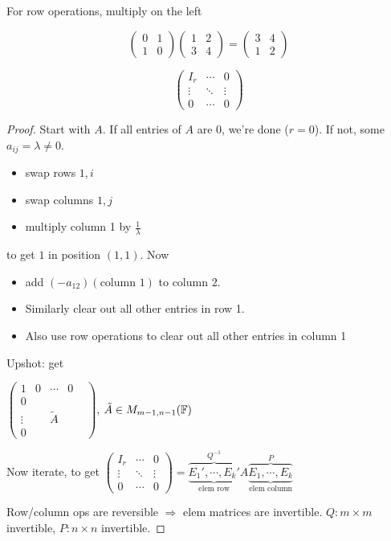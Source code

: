 \documentclass[a4paper]{article}
\begin{document}
For row operations, multiply on the left

\begin{ex}
\[ \begin{pmatrix}
0 & 1 \\
1 & 0
\end{pmatrix} \begin{pmatrix}
1 & 2\\
3 & 4
\end{pmatrix} = \begin{pmatrix}
3 & 4\\
1 & 2
\end{pmatrix} \]	
\end{ex}

 
\[ \begin{pmatrix}
I_{r} & \cdots & 0 \\
\vdots & \ddots & \vdots \\
0 & \cdots & 0  \end{pmatrix} \]

\begin{proof}
	Start with $ A $. If all entries of $ A $ are $ 0 $, we're done ($ r = 0 $). If not, some $ a_{ij} = \lambda \neq 0 $.
	\begin{itemize}
		\item swap rows $ 1,i $
		\item swap columns $ 1,j $
		\item multiply column 1 by $ \frac{1}{\lambda} $
		
	\end{itemize}
to get $ 1 $ in position $ (1,1) $. Now

\begin{itemize}
	\item add $ (-a_{12})(\text{column } 1) $ to column $ 2 $. 
	\item Similarly clear out all other entries in row 1.
	\item Also use row operations to clear out all other entries in column 1
\end{itemize}

Upshot: get

$ \begin{pmatrix}
1 & 0 & \cdots & 0 \\
0 & & & &\\
\vdots & & \tilde{A} & \\
0 & & & &
\end{pmatrix} $, $ \tilde{A} \in M_{m-1,n-1}(\mathbb{F}) $

Now iterate, to get $ \begin{pmatrix}
I_{r} & \cdots & 0 \\
\vdots & \ddots & \vdots \\
0 & \cdots & 0  \end{pmatrix} = \overbrace{\underbrace{E_{1}',\cdots,E_{k}'}_{\text{elem row}}}^{Q^{-1}} A \overbrace{\underbrace{E_{1},\cdots,E_{k}}_{\text{elem column}}}^{P}  $


Row/column ops are reversible $ \Rightarrow $ elem matrices are invertible. $ Q: m \times m $ invertible, $ P: n \times n $ invertible.

\end{proof}
\end{document}
